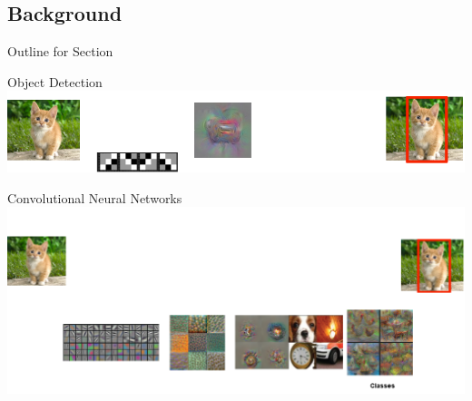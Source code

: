 \documentclass{beamer}
\begin{document}
\begin{darkframes}
    \section{Background}
    \begin{frame}{Outline for Section \thesection}
    \tableofcontents[currentsection]
	\end{frame}
	\begin{frame}{Object Detection}
	\includegraphics[width=\textwidth]{fig/ObjectDetection}
	\end{frame}
		\begin{frame}{Convolutional Neural Networks}
	\includegraphics[width=\textwidth]{fig/cnn_mine}
\end{frame}


\end{darkframes}
\end{document}
